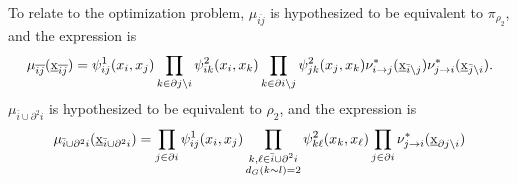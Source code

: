 \documentclass[12pt]{article}
\newcommand{\BS}{\backslash}
\newcommand{\UBX}{\underbar{\textbf{\normalfont x}}}
\newcommand{\BI}{\bar{i}}
\newcommand{\BJ}{\bar{j}}
\newcommand{\PI}{\partial i}
\newcommand{\PIN}{\partial^2 i}
\newcommand{\PJ}{\partial j}
\newcommand{\BIJ}{\overline{ij}}
\newcommand{\RA}{\rightarrow}
\numberwithin{equation}{section}
\begin{document}
To relate to the optimization problem, $\mu_{\BIJ}$ is hypothesized to be equivalent to $\pi_{\rho_2}$, and the expression is
\begin{equation}
    \mu_{\BIJ}(\UBX_{\BIJ}) = \psi^1_{ij}(x_i, x_j)\prod_{k\in\PJ\BS i} \psi^2_{ik}(x_i, x_k)\prod_{k\in\PI\BS j} \psi^2_{jk}(x_j, x_k) \nu^*_{i\RA j}(\UBX_{\BI\BS j})\nu^*_{j\RA i}(\UBX_{\BJ\BS i}).
\end{equation}
$\mu_{\BI\cup\PIN}$ is hypothesized to be equivalent to $\rho_2$, and the expression is
\begin{equation}
    \mu_{\BI\cup\PIN}(\UBX_{\BI\cup\PIN}) = \prod_{j\in\PI}\psi^1_{ij}(x_i, x_j)\prod_{\substack{k, \ell\in\BI\cup\PIN\\d_G(k\sim l)=2}}\psi^2_{k\ell}(x_k, x_\ell)\prod_{j\in \PI}\nu^*_{j\RA i}(\UBX_{\PJ\BS i})
\end{equation}
\end{document}
